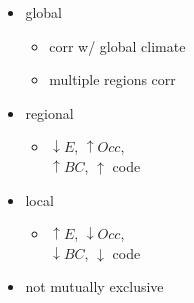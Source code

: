 \documentclass{beamer}
\begin{document}
\begin{frame}
\begin{columns}
\begin{column}{0.55\textwidth}
      \tiny{}
    \end{column}
    \begin{column}{0.45\textwidth}
      \begin{itemize}
        \item global
          \begin{itemize}
            \item corr w/ global climate
            \item multiple regions corr
          \end{itemize}
        \item regional
          \begin{itemize}
            \item \(\downarrow E\), \(\uparrow Occ\), \\\(\uparrow BC\), \(\uparrow\) code
          \end{itemize}
        \item local
          \begin{itemize}
            \item \(\uparrow E\), \(\downarrow Occ\), \\\(\downarrow BC\), \(\downarrow\) code
          \end{itemize}
        \item \alert{not mutually exclusive}
      \end{itemize}
    \end{column}
  \end{columns}
\end{frame}
\end{document}
